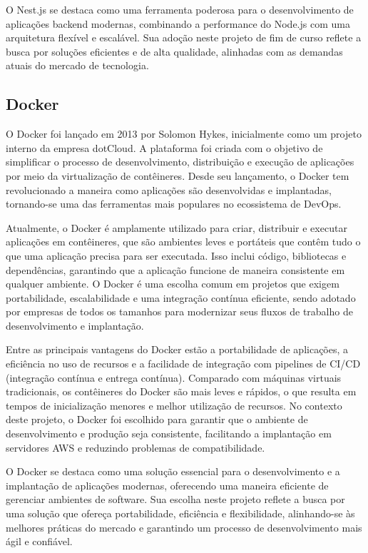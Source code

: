 O Nest.js se destaca como uma ferramenta poderosa para o desenvolvimento de aplicações backend modernas, combinando a performance do Node.js com uma arquitetura flexível e escalável. Sua adoção neste projeto de fim de curso reflete a busca por soluções eficientes e de alta qualidade, alinhadas com as demandas atuais do mercado de tecnologia.

\subsection{Docker}

O Docker foi lançado em 2013 por Solomon Hykes, inicialmente como um projeto interno da empresa dotCloud. A plataforma foi criada com o objetivo de simplificar o processo de desenvolvimento, distribuição e execução de aplicações por meio da virtualização de contêineres. Desde seu lançamento, o Docker tem revolucionado a maneira como aplicações são desenvolvidas e implantadas, tornando-se uma das ferramentas mais populares no ecossistema de DevOps.

Atualmente, o Docker é amplamente utilizado para criar, distribuir e executar aplicações em contêineres, que são ambientes leves e portáteis que contêm tudo o que uma aplicação precisa para ser executada. Isso inclui código, bibliotecas e dependências, garantindo que a aplicação funcione de maneira consistente em qualquer ambiente. O Docker é uma escolha comum em projetos que exigem portabilidade, escalabilidade e uma integração contínua eficiente, sendo adotado por empresas de todos os tamanhos para modernizar seus fluxos de trabalho de desenvolvimento e implantação.

Entre as principais vantagens do Docker estão a portabilidade de aplicações, a eficiência no uso de recursos e a facilidade de integração com pipelines de CI/CD (integração contínua e entrega contínua). Comparado com máquinas virtuais tradicionais, os contêineres do Docker são mais leves e rápidos, o que resulta em tempos de inicialização menores e melhor utilização de recursos. No contexto deste projeto, o Docker foi escolhido para garantir que o ambiente de desenvolvimento e produção seja consistente, facilitando a implantação em servidores AWS e reduzindo problemas de compatibilidade.

O Docker se destaca como uma solução essencial para o desenvolvimento e a implantação de aplicações modernas, oferecendo uma maneira eficiente de gerenciar ambientes de software. Sua escolha neste projeto reflete a busca por uma solução que ofereça portabilidade, eficiência e flexibilidade, alinhando-se às melhores práticas do mercado e garantindo um processo de desenvolvimento mais ágil e confiável.

